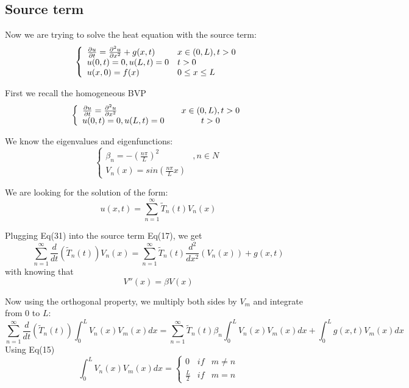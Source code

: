 \documentclass[12pt]{article} %
\begin{document}
\subsection{Source term}
\hspace{5mm}Now we are trying to solve the heat equation with the source term:
\begin{equation}
\left \{ \begin{array}{llc}
\pdv{u}{t} =\frac{\partial^{2}u}{\partial x^{2}} + g(x, t)& x \in (0,L),  t>0 \\
u(0,t) = 0, u(L, t) = 0& t>0 \\
u(x, 0) = f(x) & 0 \leq x \leq L
\end{array}\right.
\end{equation}\par
First we recall the homogeneous BVP
$$
\left \{ \begin{array}{llc}
\pdv{u}{t} =\frac{\partial^{2}u}{\partial x^{2}} & & x \in (0,L),  t>0 \\
u(0,t) = 0, u(L, t) = 0 && t>0 
\end{array}\right.
$$\par 
We know the eigenvalues and eigenfunctions:
$$
\left\{
 \begin{array}{lcc}
 \beta_{n} = - \left(
\frac{n \pi}{L}
\right)^{2} &, n \in N \\
V_{n}(x) = sin(\frac{n\pi}{L}x)
 \end{array} \right.
$$\par
We are looking for the solution of the form:
\begin{equation}
u(x, t) = \sum_{n=1}^{\infty}\tilde{T}_{n}(t)V_{n}(x)
\end{equation}\par
Plugging Eq(31) into the source term Eq(17), we get
$$
\sum_{n=1}^{\infty}\frac{d}{dt}(\tilde{T}_{n}(t))V_{n}(x) = \sum_{n=1}^{\infty}\tilde{T}_{n}(t) \frac{d^{2}}{dx^{2}}(V_{n}(x)) + g(x, t)
$$
with knowing that 
$$
V''(x) = \beta V(x)
$$\par
Now using the orthogonal property, we multiply both sides by $V_{m}$ and integrate from 0 to $L$:
$$
\sum_{n=1}^{\infty}\frac{d}{dt}(\tilde{T}_{n}(t))\int_{0}^{L}V_{n}(x)V_{m}(x)dx = \sum_{n=1}^{\infty}\tilde{T}_{n}(t)\beta_{n} \int_{0}^{L}V_{n}(x)V_{m}(x)dx  + \int_{0}^{L}g(x, t)V_{m}(x)dx 
$$
Using Eq(15)
$$
\int_{0}^{L}V_{n}(x)V_{m}(x)dx = 
\left\{
\begin{array}{lcc}
0 & if & m \neq n \\
\frac{L}{2} & if& m = n
\end{array}
\right.
$$\par
\end{document}
